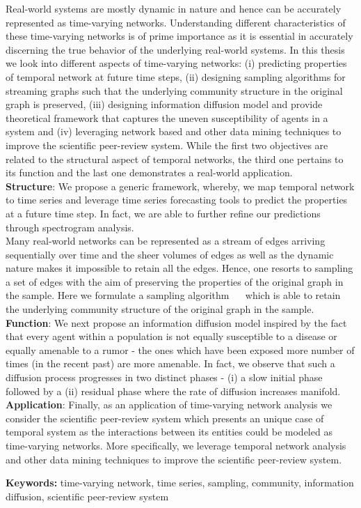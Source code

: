

\thispagestyle{empty}
Real-world systems are mostly dynamic in nature and hence can be accurately represented as time-varying networks. Understanding different characteristics 
of these time-varying networks is of prime importance as it is essential in accurately discerning the true behavior of the underlying real-world systems. In this thesis we look into different aspects of time-varying networks: (i) predicting properties of temporal network at future time steps, (ii) designing sampling algorithms for streaming
graphs such that the underlying community structure in the original graph is preserved, (iii) designing information diffusion model and provide theoretical framework
that captures the uneven susceptibility of agents in a system and (iv) leveraging network based and other data mining techniques to improve the scientific peer-review system.
While the first two objectives are related to the structural aspect of temporal networks, the third one pertains to its function and the last one demonstrates a real-world application.\\
{\bf Structure}: We propose a generic framework, whereby, we map temporal network to time series and leverage time series forecasting tools to predict the properties at a future
time step. In fact, we are able to further refine our predictions through spectrogram analysis.\\
Many real-world networks can be represented as a stream of edges arriving sequentially over time and the sheer volumes of edges as well as the dynamic nature makes it impossible to retain all the edges. Hence, one resorts to sampling a set of edges with the aim of preserving the properties of the original graph in the sample. Here we formulate a sampling algorithm ~\compas~ which is able to retain the underlying community structure of the original graph in the sample.\\
{\bf Function}: We next propose an information diffusion model inspired by the fact that every agent within a population is not equally susceptible to a disease
or equally amenable to a rumor - the ones which have been exposed more number of times (in the recent past) are more amenable. In fact, we observe that such a diffusion process progresses in two distinct phases - (i) a slow initial phase followed by a (ii) residual phase where the rate of diffusion increases manifold. \\
{\bf Application}: Finally, as an application of time-varying network analysis we consider the scientific peer-review system which presents an unique case of temporal system as the interactions between its entities could be modeled as time-varying networks. More specifically, we leverage temporal network analysis and other data mining techniques to improve the scientific peer-review system.
 


\medskip


\noindent \textbf{Keywords:} time-varying network, time series, sampling, community, information diffusion, scientific peer-review system 
